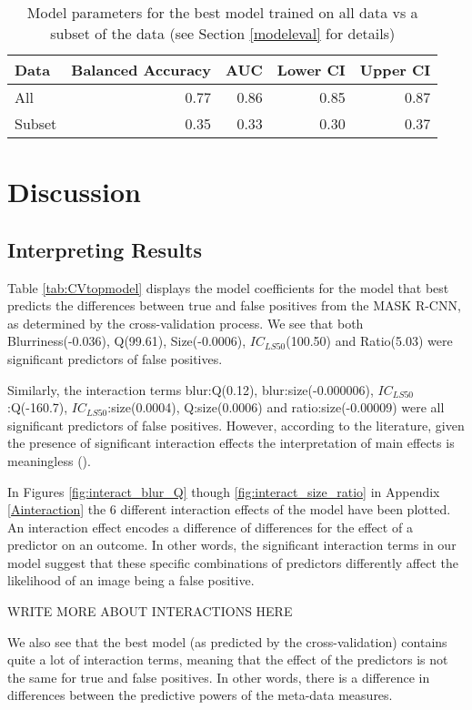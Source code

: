 \documentclass[12pt]{article}
\begin{document}
\begin{table}[ht]
	\centering
	\caption{Model parameters for the best model trained on all data vs a subset of the data (see Section \ref{modeleval} for details)}
	\begin{tabular}{lrrrr}
	  \toprule
	Data & Balanced Accuracy & AUC & Lower CI & Upper CI \\ 
	  \midrule
	All & 0.77 & 0.86 & 0.85 & 0.87 \\
	Subset & 0.35 & 0.33 & 0.30 & 0.37 \\ 
	   \bottomrule
	\end{tabular}
	\label{tab:NarsvsThul}
\end{table}

\clearpage
\section{Discussion}
\subsection{Interpreting Results}
Table \ref{tab:CVtopmodel} displays the model coefficients for the model that best predicts the differences between true and false positives from the MASK R-CNN, as determined by the cross-validation process. We see that both Blurriness(-0.036), Q(99.61), Size(-0.0006), $IC_{LS50}$(100.50) and Ratio(5.03) were significant predictors of false positives. 

Similarly, the interaction terms blur:Q(0.12), blur:size(-0.000006), $IC_{LS50}$:Q(-160.7), $IC_{LS50}$:size(0.0004), Q:size(0.0006) and ratio:size(-0.00009) were all significant predictors of false positives. However, according to the literature, given the presence of significant interaction effects the interpretation of main effects is meaningless (\cite{fieldDiscoveringStatisticsUsing2012}).

In Figures \ref{fig:interact_blur_Q} though \ref{fig:interact_size_ratio} in Appendix \ref{Ainteraction} the 6 different interaction effects of the model have been plotted. An interaction effect encodes a difference of differences for the effect of a predictor on an outcome. In other words, the significant interaction terms in our model suggest that these specific combinations of predictors differently affect the likelihood of an image being a false positive.

WRITE MORE ABOUT INTERACTIONS HERE

We also see that the best model (as predicted by the cross-validation) contains quite a lot of interaction terms, meaning that the effect of the predictors is not the same for true and false positives. In other words, there is a difference in differences between the predictive powers of the meta-data measures.
\end{document}
